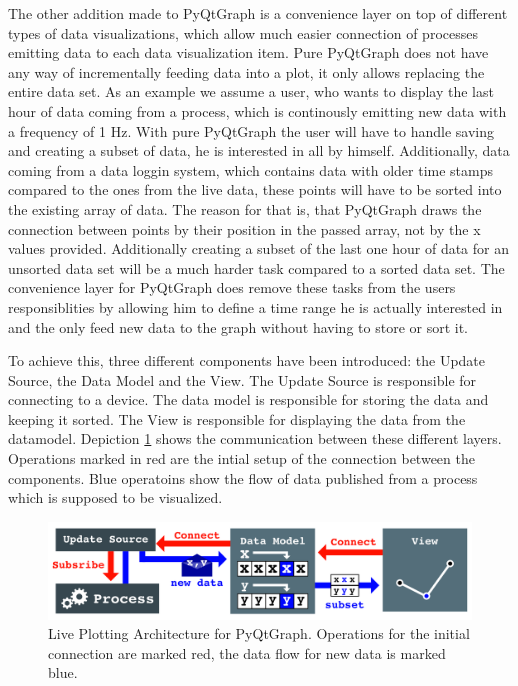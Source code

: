 The other addition made to PyQtGraph is a convenience layer on top of different types of data visualizations, which allow much easier connection of processes emitting data to each data visualization item. Pure PyQtGraph does not have any way of incrementally feeding data into a plot, it only allows replacing the entire data set. As an example we assume a user, who wants to display the last hour of data coming from a process, which is continously emitting new data with a frequency of 1 Hz. With pure PyQtGraph the user will have to handle saving and creating a subset of data, he is interested in all by himself. Additionally, data coming from a data loggin system, which contains data with older time stamps compared to the ones from the live data, these points will have to be sorted into the existing array of data. The reason for that is, that PyQtGraph draws the connection between points by their position in the passed array, not by the x values provided. Additionally creating a subset of the last one hour of data for an unsorted data set will be a much harder task compared to a sorted data set. The convenience layer for PyQtGraph does remove these tasks from the users responsiblities by allowing him to define a time range he is actually interested in and the only feed new data to the graph without having to store or sort it.

To achieve this, three different components have been introduced: the Update Source, the Data Model and the View. The Update Source is responsible for connecting to a device. The data model is responsible for storing the data and keeping it sorted. The View is responsible for displaying the data from the datamodel. Depiction \ref{fig:application:pyqtgraph:updatesource} shows the communication between these different layers. Operations marked in red are the intial setup of the connection between the components. Blue operatoins show the flow of data published from a process which is supposed to be visualized.

\begin{figure}[h]
    \centering
    \includegraphics[width=14cm]{resources/img/PyQtGraphUpdateSource}
    \caption{Live Plotting Architecture for PyQtGraph. Operations for the initial connection are marked red, the data flow for new data is marked blue.}
    \label{fig:application:pyqtgraph:updatesource}
\end{figure}

